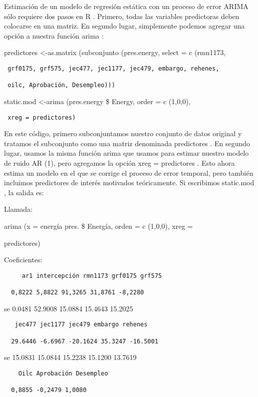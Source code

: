 \documentclass[
]{book}
\begin{document}
Estimación de un modelo de regresión estática con un proceso de error ARIMA sólo requiere dos pasos en R . Primero, todas las variables predictoras deben colocarse en una matriz. En segundo lugar, simplemente podemos agregar una opción a nuestra función arima :

predictores \textless-as.matrix (subconjunto (pres.energy, select = c (rmn1173,

\begin{verbatim}
 grf0175, grf575, jec477, jec1177, jec479, embargo, rehenes,

 oilc, Aprobación, Desempleo)))
\end{verbatim}

static.mod \textless-arima (pres.energy \$ Energy, order = c (1,0,0),

\begin{verbatim}
 xreg = predictores)
\end{verbatim}

En este código, primero subconjuntamos nuestro conjunto de datos original y tratamos el subconjunto como una matriz denominada predictores . En segundo lugar, usamos la misma función arima que usamos para estimar nuestro modelo de ruido AR (1), pero agregamos la opción xreg = predictores . Esto ahora estima un modelo en el que se corrige el proceso de error temporal, pero también incluimos predictores de interés motivados teóricamente. Si escribimos static.mod , la salida es:

Llamada:

arima (x = energía pres. \$ Energía, orden = c (1,0,0), xreg =

predictores)

Coeficientes:

\begin{verbatim}
     ar1 intercepción rmn1173 grf0175 grf575

  0,8222 5,8822 91,3265 31,8761 -8,2280
\end{verbatim}

se 0.0481 52.9008 15.0884 15.4643 15.2025

\begin{verbatim}
   jec477 jec1177 jec479 embargo rehenes

  29.6446 -6.6967 -20.1624 35.3247 -16.5001
\end{verbatim}

se 15.0831 15.0844 15.2238 15.1200 13.7619

\begin{verbatim}
    Oilc Aprobación Desempleo

  0,8855 -0,2479 1,0080
\end{verbatim}
\end{document}
